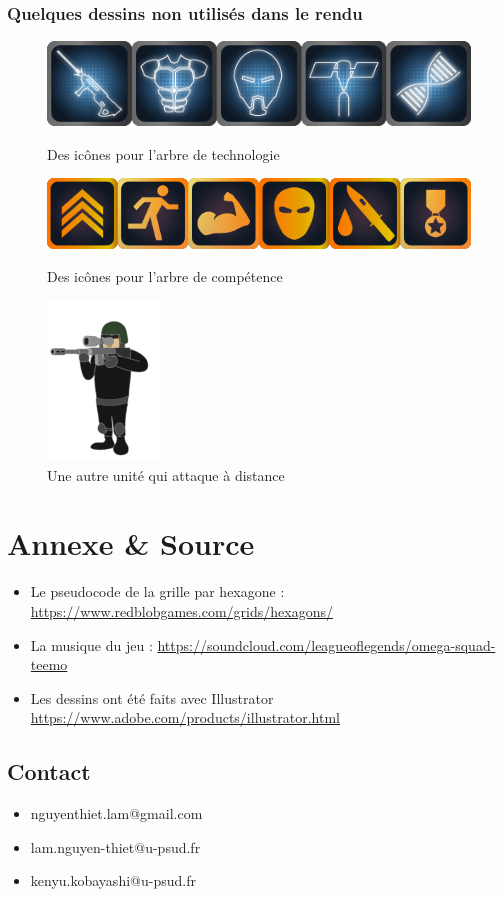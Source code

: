 \documentclass{article}
\begin{document}
\subsubsection{Quelques dessins non utilisés dans le rendu}
    \begin{figure}[H]
        \centering
     \includegraphics[scale=0.5]{asset/image/tech.png}
    \caption{Des icônes pour l'arbre de technologie}
    \vspace{1cm}

     \includegraphics[scale=0.5]{asset/image/skill.png}
    \caption{Des icônes pour l'arbre de compétence}
    \vspace{1cm}

     \includegraphics[scale=0.5]{asset/image/sniper_eu.png}
    \caption{Une autre unité qui attaque à distance}
    \end{figure}

\section{Annexe \& Source}
\begin{itemize}
    \item Le pseudocode de la grille par hexagone : \url{https://www.redblobgames.com/grids/hexagons/}
    \item La musique du jeu : \url{https://soundcloud.com/leagueoflegends/omega-squad-teemo}
    \item Les dessins ont été faits avec Illustrator \url{https://www.adobe.com/products/illustrator.html}
\end{itemize}
\subsection{Contact}
\begin{itemize}
    \item nguyenthiet.lam@gmail.com
    \item lam.nguyen-thiet@u-psud.fr
    \item kenyu.kobayashi@u-psud.fr
\end{itemize}
\end{document}
